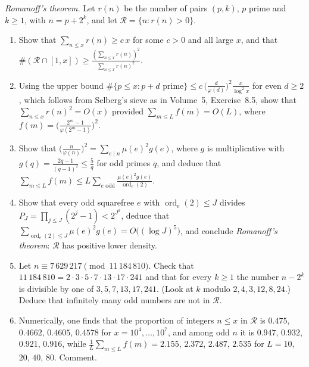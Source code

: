 \begin{exercise}[Journey]\label{pb:romanoff}
\emph{Romanoff's theorem.} Let $r(n)$ be the number of pairs $(p,k)$, $p$ prime and $k\ge1$, with $n=p+2^k$, and let $\mathcal R=\{n:r(n)>0\}$.
\begin{enumerate}[label=(\alph*)]
\item Show that $\sum_{n\le x}r(n)\ge c\,x$ for some $c>0$ and all large $x$, and that $\#(\mathcal R\cap[1,x])\ge\frac{(\sum_{n\le x}r(n))^2}{\sum_{n\le x}r(n)^2}$.
\item Using the upper bound $\#\{p\le x:p+d\text{ prime}\}\le c\,\bigl(\frac d{\varphi(d)}\bigr)^2\frac x{\log^2x}$ for even $d\ge2$, which follows from Selberg's sieve as in
Volume~5, Exercise~8.5, show that $\sum_{n\le x}r(n)^2=O(x)$ provided $\sum_{m\le L}f(m)=O(L)$, where $f(m)=\bigl(\frac{2^m-1}{\varphi(2^m-1)}\bigr)^2$.
\item Show that $\bigl(\frac n{\varphi(n)}\bigr)^2=\sum_{e\mid n}\mu(e)^2g(e)$, where $g$ is multiplicative with $g(q)=\frac{2q-1}{(q-1)^2}\le\frac5q$ for odd primes $q$, and
deduce that $\sum_{m\le L}f(m)\le L\sum_{e\text{ odd}}\frac{\mu(e)^2g(e)}{\operatorname{ord}_e(2)}$.
\item Show that every odd squarefree $e$ with $\operatorname{ord}_e(2)\le J$ divides $P_J=\prod_{j\le J}(2^j-1)<2^{J^2}$, deduce that
$\sum_{\operatorname{ord}_e(2)\le J}\mu(e)^2g(e)=O\bigl((\log J)^5\bigr)$, and conclude \emph{Romanoff's theorem}: $\mathcal R$ has positive lower density.
\item Let $n\equiv7\,629\,217\pmod{11\,184\,810}$. Check that $11\,184\,810=2\cdot3\cdot5\cdot7\cdot13\cdot17\cdot241$ and that for every $k\ge1$ the number $n-2^k$ is
divisible by one of $3,5,7,13,17,241$. (Look at $k$ modulo $2,4,3,12,8,24$.) Deduce that infinitely many odd numbers are not in $\mathcal R$.
\item Numerically, one finds that the proportion of integers $n\le x$ in $\mathcal R$ is $0.475$, $0.4662$, $0.4605$, $0.4578$ for $x=10^4,\dots,10^7$, and among odd $n$
it is $0.947$, $0.932$, $0.921$, $0.916$, while $\frac1L\sum_{m\le L}f(m)=2.155$, $2.372$, $2.487$, $2.535$ for $L=10$, $20$, $40$, $80$. Comment.
\end{enumerate}
\end{exercise}

